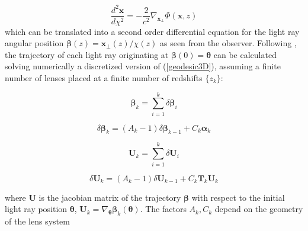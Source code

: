 \documentclass[reprint,aps,prd,superscriptaddress,showkeys,showpacs]{revtex4-1}
\newcommand{\bb}[1]{\mathbf{#1}}
\begin{document}
\begin{equation}
\label{geodesic3D}
\frac{d^2\bb{x}}{d\chi^2} = -\frac{2}{c^2}\nabla_\bb{x_\perp}\Phi(\bb{x},z)
\end{equation}
%
which can be translated into a second order differential equation for the light ray angular position $\pmb{\beta}(z)=\bb{x}_\perp(z)/\chi(z)$ as seen from the observer. Following \citep{RayTracingHartlap}, the trajectory of each light ray originating at $\pmb{\beta}(0)=\pmb{\theta}$ can be calculated solving numerically a discretized version of (\ref{geodesic3D}), assuming a finite number of lenses placed at a finite number of redshifts $\{z_k\}$:
%

\begin{widetext}

\begin{equation}
\label{geodesic2D}
\pmb{\beta}_{k} = \sum_{i=1}^k\delta\pmb{\beta}_i 
\end{equation}

\begin{equation}
\delta\pmb{\beta}_k = (A_k-1)\delta\pmb{\beta}_{k-1} + C_k\pmb{\alpha}_k 
\end{equation}

\begin{equation}
\bb{U}_{k} = \sum_{i=1}^k\delta\bb{U}_i 
\end{equation}

\begin{equation}
\delta\bb{U}_k = (A_k-1)\delta\bb{U}_{k-1} + C_k\bb{T}_k\bb{U}_k
\end{equation}

\end{widetext}
%
where $\bb{U}$ is the jacobian matrix of the trajectory $\pmb{\beta}$ with respect to the initial light ray position $\pmb{\theta}$, $\bb{U}_k=\nabla_{\pmb{\theta}}\pmb{\beta}_k(\pmb{\theta})$. The factors $A_k,C_k$ depend on the geometry of the lens system
\end{document}
